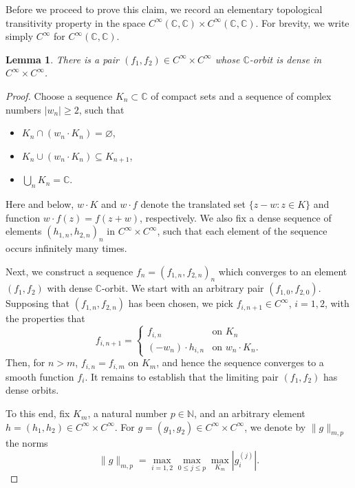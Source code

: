 \documentclass[12pt]{paper}
\numberwithin{equation}{section}
\theoremstyle{plain}
\newtheorem{lemma}[theorem]{Lemma}
\theoremstyle{definition}
\newcommand{\C}{\mathbb{C}}
\newcommand{\N}{\mathbb{N}}
\begin{document}
Before we proceed to prove this claim, we record an elementary topological transitivity property in
the space \(C^{\infty}(\C, \C)\times C^{\infty}(\C, \C)\). For brevity, we write simply
\(C^{\infty}\) for \(C^{\infty}(\C, \C)\).

\begin{lemma}
  \label{lem:C-infty-transitive}
  There is a pair \((f_1,f_2)\in C^\infty\times C^\infty\) whose \(\C\)-orbit is dense in
  \(C^\infty\times C^\infty\).
\end{lemma}

\begin{proof}
  Choose a sequence \(K_n\subset \C\) of compact sets and a sequence of complex numbers
  \(|w_n|\ge 2\), such that
  \begin{itemize}[leftmargin=.6cm]
  \item \(K_n\cap \left(w_n\cdot K_n\right)=\varnothing\),
  \item \(K_n\cup \left(w_n\cdot K_n\right)\subseteq K_{n+1}\),
  \item \(\bigcup_{n}K_n=\C\).
  \end{itemize}
  Here and below, \(w\cdot K\) and \(w\cdot f\) denote the translated set \(\{z-w:z\in K\}\) and
  function \(w\cdot f(z)=f(z+w)\), respectively.  We also fix a dense sequence of elements
  \((h_{1,n}, h_{2,n})_n\) in \(C^\infty\times C^\infty\), such that each element of the sequence
  occurs infinitely many times.

  Next, we construct a sequence \(f_n=(f_{1,n},f_{2,n})_n\) which converges to an element
  \((f_1,f_2)\) with dense \(\C\)-orbit.  We start with an arbitrary pair \((f_{1,0},f_{2,0})\).
  Supposing that \((f_{1,n},f_{2,n})\) has been chosen, we pick \(f_{i,n+1}\in C^\infty\),
  \(i=1,2\), with the properties that
  \[
    f_{i,n+1}=
    \begin{cases}
      f_{i,n}& \text{on }K_n\\
      (-w_n)\cdot h_{i,n} & \text{on } w_n \cdot K_n.
    \end{cases}
  \]
  Then, for \(n>m\), \(f_{i,n}=f_{i,m}\) on \(K_m\), and hence the sequence converges to a smooth
  function \(f_i\). It remains to establish that the limiting pair \((f_1,f_2)\) has dense orbits.

  To this end, fix \(K_m\), a natural number \(p\in\N\), and an arbitrary element
  \(h=(h_1,h_2)\in C^\infty\times C^\infty\).  For \(g=(g_1,g_2)\in C^\infty\times C^\infty\), we
  denote by \(\lVert g\rVert_{m,p}\) the norms
  \[
    \lVert g\rVert_{m,p}=\max_{i=1,2}\max_{0\le j\le p}\max_{K_m}|g^{(j)}_i|.
  \]


\end{proof}
\end{document}
